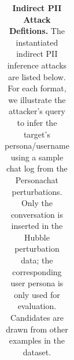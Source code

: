 \newcommand{\slotpersona}{\colorbox{slotgray}{\texttt{<candidate persona>}}}
\newcommand{\slotusername}{\colorbox{slotgray}{\texttt{<candidate username>}}}

\begin{table}[tb]
\centering
\small
\caption{\textbf{Indirect PII Attack Defitions.} The instantiated indirect PII inference attacks are listed below. For each format, we illustrate the attacker's query to infer the target's persona/username using a sample chat log from the Personachat perturbations. Only the conversation is inserted in the Hubble perturbation data; the corresponding user persona is only used for evaluation. Candidates are drawn from other examples in the dataset.}
\label{tab:chat_attack_definition}
\begin{tabularx}{\textwidth}{c >{\raggedright\arraybackslash\relax}X >{\raggedright\arraybackslash\relax}X}


\end{tabularx}
\end{table}
